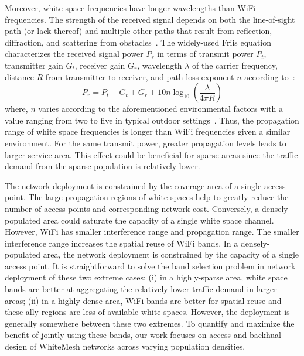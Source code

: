 Moreover, white space frequencies have longer wavelengths than WiFi frequencies. 
The strength of the received signal depends on both the line-of-sight path (or lack 
thereof) and multiple other paths that result from reflection, diffraction, and scattering 
from obstacles~\cite{andersen1995propagation}. The widely-used Friis equation characterizes 
the received signal power $P_r$ in terms of transmit power $P_t$, transmitter gain $G_t$, 
receiver gain $G_r$, wavelength $\lambda$ of the carrier frequency, distance $R$ from transmitter 
to receiver, and path loss exponent $n$ according to~\cite{friis}:
\begin{equation}
\label{eq:friis}
P_r=P_t+G_t+G_r+10n \log_{10}\left( \frac{\lambda}{4\pi R}\right)
\end{equation}
where, $n$ varies according to the aforementioned environmental factors with a value 
ranging from two to five in typical outdoor settings~\cite{rappaport}.
Thus, the propagation range of white space frequencies is longer than WiFi frequencies
given a similar environment. For the same transmit power, greater propagation levels leads to larger service area.
This effect could be beneficial for sparse areas since the traffic demand from the sparse population is relatively lower. 

The network deployment is constrained by the coverage area of a single access point. 
The large propagation regions of white spaces help to greatly reduce the number of access points and corresponding network cost. 
Conversely, a densely-populated area could saturate the capacity of a single white space channel. 
However, WiFi has smaller interference range and propagation range. The smaller interference range increases 
the spatial reuse of WiFi bands. In a densely-populated area, the network deployment is constrained by the 
capacity of a single access point. It is straightforward to solve the band selection problem in network deployment 
of these two extreme cases: (i) in a highly-sparse area, white space bands are better at aggregating the 
relatively lower traffic demand in larger areas; (ii) in a highly-dense area, WiFi bands are better 
for spatial reuse and these ally regions are less of available white spaces.
However, the deployment is generally somewhere between these two extremes. 
To quantify and maximize the benefit of jointly using these bands, 
our work focuses on access and backhual design of WhiteMesh networks across varying population densities. 



